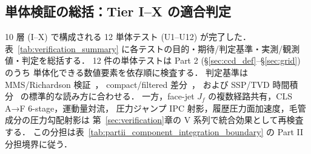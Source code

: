 %
\subsection{単体検証の総括：Tier I--X の適合判定}
\label{sec:verify_summary}

10 層 (I--X) で構成される 12 単体テスト (U1--U12) が完了した．
表~\ref{tab:verification_summary} に各テストの目的・期待/判定基準・実測/観測値・判定を総括する．
12 件の単体テストは Part 2 (§\ref{sec:ccd_def}--§\ref{sec:grid}) のうち
単体化できる数値要素を依存順に検査する．
判定基準は MMS/Richardson 検証~\cite{Roache2002,SalariKnupp2000,Roy2003}，
compact/filtered 差分~\cite{Lele1992,GaitondeVisbal2000,VisbalGaitonde2002}，
および SSP/TVD 時間積分~\cite{ShuOsher1988,GottliebShu1998,GottliebShuTadmor2001}
の標準的な読み方に合わせる．
一方，face-jet $J_f$ の複数経路共有，CLS A→F 6-stage，運動量対流，
圧力ジャンプ IPC 射影，履歴圧力面加速度，毛管成分の圧力勾配射影は
第~\ref{sec:verification}章の V 系列で統合効果として再検査する．
この分担は表~\ref{tab:partii_component_integration_boundary} の
Part II 分担境界に従う．

